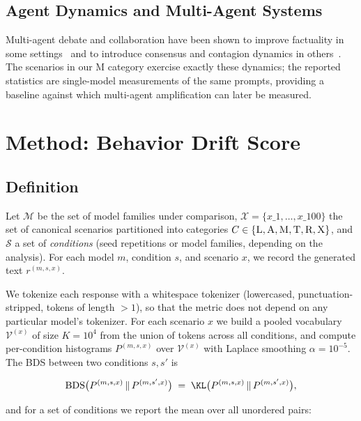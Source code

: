 \documentclass[11pt]{article}
\DeclareMathOperator{\BDS}{BDS}
\begin{document}
\subsection{Agent Dynamics and Multi-Agent Systems}

Multi-agent debate and collaboration have been shown to improve factuality
in some settings~\citep{du2024improving,li2023camel,liang2023multiagent}
and to introduce consensus and contagion dynamics in
others~\citep{park2023generative,liu2026memorycontagion}. The scenarios in
our \textsc{M} category exercise exactly these dynamics; the reported
statistics are single-model measurements of the same prompts, providing a
baseline against which multi-agent amplification can later be measured.

\section{Method: Behavior Drift Score}
\label{sec:method}

\subsection{Definition}

Let $\mathcal{M}$ be the set of model families under comparison, $\mathcal{X}
= \{x\_1, \ldots, x\_{100}\}$ the set of canonical scenarios partitioned into
categories $C \in \{\textsc{L}, \textsc{A}, \textsc{M}, \textsc{T},
\textsc{R}, \textsc{X}\}$, and $\mathcal{S}$ a set of \emph{conditions}
(seed repetitions or model families, depending on the analysis). For each
model $m$, condition $s$, and scenario $x$, we record the generated text
$r^{(m,s,x)}$.

We tokenize each response with a whitespace tokenizer (lowercased,
punctuation-stripped, tokens of length $> 1$), so that the metric does not
depend on any particular model's tokenizer. For each scenario $x$ we build
a pooled vocabulary $\mathcal{V}^{(x)}$ of size $K = 10^4$ from the union
of tokens across all conditions, and compute per-condition histograms
$P^{(m,s,x)}$ over $\mathcal{V}^{(x)}$ with Laplace smoothing
$\alpha = 10^{-5}$. The BDS between two conditions $s, s'$ is

\begin{equation}
  \BDS\bigl(P^{(m,s,x)} \,\|\, P^{(m,s',x)}\bigr)
  \;=\; \KL\bigl(P^{(m,s,x)} \,\|\, P^{(m,s',x)}\bigr),
\end{equation}

and for a set of conditions we report the mean over all unordered pairs:
\end{document}
